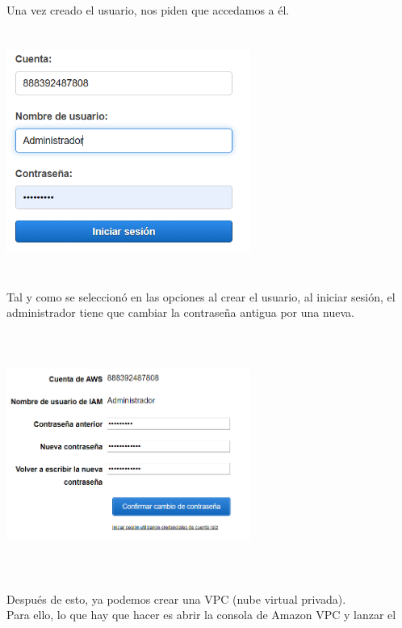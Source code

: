 \documentclass[english,runningheads,a4paper]{llncs}[2018/03/10]
\newenvironment{nscenter}
 {\parskip=0pt\par\nopagebreak\centering}
 {\par\noindent\ignorespacesafterend}
\begin{document}
\newline
Una vez creado el usuario, nos piden que accedamos a él.
\newline
\begin{nscenter}
\includegraphics[width=8cm,height=8cm,keepaspectratio]{./Contenedores/AWS/30.png}
\end{nscenter}
\newline
Tal y como se seleccionó en las opciones al crear el usuario, al iniciar sesión,
el administrador tiene que cambiar la contraseña antigua por una nueva.\newline
\newline
\begin{nscenter}
\includegraphics[width=8cm,height=8cm,keepaspectratio]{./Contenedores/AWS/31.png}
\end{nscenter}
\newline
Después de esto, ya podemos crear una VPC (nube virtual privada). \\
Para ello, lo que hay que hacer es abrir la consola de Amazon VPC y lanzar el 
\end{document}
